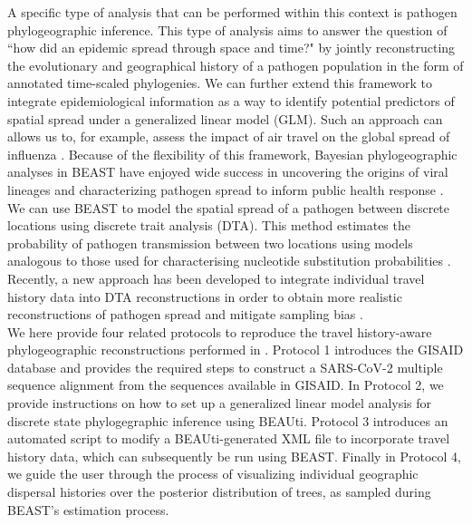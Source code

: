 \documentclass{article}
\begin{document}
A specific type of analysis that can be performed within this context is pathogen phylogeographic inference.
This type of analysis aims to answer the question of ``how did an epidemic spread through space and time?" by jointly reconstructing the evolutionary and geographical history of a pathogen population in the form of annotated time-scaled phylogenies. We can further extend this framework to integrate epidemiological information as a way to identify potential predictors of spatial spread under a generalized linear model (GLM). Such an approach can allows us to, for example, assess the impact of air travel on the global spread of influenza \cite{glm}. 
Because of the flexibility of this framework, Bayesian phylogeographic analyses in BEAST have enjoyed wide success in uncovering the origins of viral lineages \cite{hiv} and characterizing pathogen spread to inform public health response \cite{ebola}. \\

We can use BEAST to model the spatial spread of a pathogen between discrete locations using discrete trait analysis (DTA).
This method estimates the probability of pathogen transmission between two locations using models analogous to those used for characterising nucleotide substitution probabilities \cite{dta}.
Recently, a new approach has been developed to integrate individual travel history data into DTA reconstructions in order to obtain more realistic reconstructions of pathogen spread and mitigate sampling bias \cite{travhist}. \\

We here provide four related protocols to reproduce the travel history-aware phylogeographic reconstructions performed in \cite{travhist}. %
Protocol 1 introduces the GISAID database and provides the required steps to construct a SARS-CoV-2 multiple sequence alignment from the sequences available in GISAID.
In Protocol 2, we provide instructions on how to set up a generalized linear model analysis for discrete state phylogegraphic inference using BEAUti.
Protocol 3 introduces an automated script to modify a BEAUti-generated XML file to incorporate travel history data, which can subsequently be run using BEAST.
Finally in Protocol 4, we guide the user through the process of visualizing individual geographic dispersal histories over the posterior distribution of trees, as sampled during BEAST's estimation process.
\end{document}
